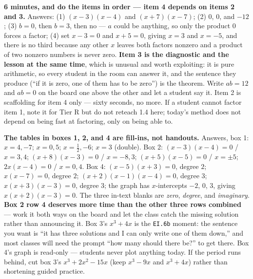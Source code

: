 \documentclass[10pt]{article}
\begin{document}
\begin{teachernote}[Warm-Up]
    \textbf{6 minutes, and do the items in order --- item 4 depends on items 2 and 3.} Answers:
    (1) $(x-3)(x-4)$ and $(x+7)(x-7)$; (2) $0$, $0$, and $-12$; (3) $b=0$, then $b=3$, then no ---
    $a$ could be anything, so only the product $0$ forces a factor; (4) set $x-3=0$ and $x+5=0$,
    giving $x=3$ and $x=-5$, and there is no third because any other $x$ leaves both factors nonzero
    and a product of two nonzero numbers is never zero. \textbf{Item 3 is the diagnostic and the
    lesson at the same time}, which is unusual and worth exploiting: it is pure arithmetic, so every
    student in the room can answer it, and the sentence they produce (``if it is zero, one of them
    has to be zero'') is the theorem. Write $ab=12$ and $ab=0$ on the board one above the other and
    let a student say it. Item 2 is scaffolding for item 4 only --- sixty seconds, no more. If a
    student cannot factor item 1, note it for Tier R but do not reteach 1.4 here; today's method
    does not depend on being fast at factoring, only on being able to.
\end{teachernote}

\begin{teachernote}
    \textbf{The tables in boxes 1, 2, and 4 are fill-ins, not handouts.} Answers, box 1: $x=4,-7$;
    $x=0,5$; $x=\tfrac12,-6$; $x=3$ (double). Box 2: $(x-3)(x-4)=0$ / $x=3,4$; $(x+8)(x-3)=0$ /
    $x=-8,3$; $(x+5)(x-5)=0$ / $x=\pm5$; $2x(x-4)=0$ / $x=0,4$. Box 4: $(x-5)(x+3)=0$, degree $2$;
    $x(x-7)=0$, degree $2$; $(x+2)(x-1)(x-4)=0$, degree $3$; $x(x+3)(x-3)=0$, degree $3$; the graph
    has $x$-intercepts $-2$, $0$, $3$, giving $x(x+2)(x-3)=0$. The three in-text blanks are
    \emph{zero}, \emph{degree}, and \emph{imaginary}. \textbf{Box 2 row 4 deserves more time than
    the other three rows combined} --- work it both ways on the board and let the class catch the
    missing solution rather than announcing it. Box 3's $x^3+4x$ is the \texttt{EI.6b} moment: the
    sentence you want is ``it has three solutions and I can only write one of them down,'' and most
    classes will need the prompt ``how many should there be?'' to get there. Box 4's graph is
    read-only --- students never plot anything today. If the period runs behind, cut box 3's
    $x^3+2x^2-15x$ (keep $x^3-9x$ and $x^3+4x$) rather than shortening guided practice.
\end{teachernote}
\end{document}
